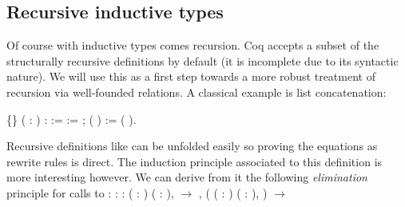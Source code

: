 \subsection{Recursive inductive types}




   Of course with inductive types comes recursion. Coq accepts a subset
   of the structurally recursive definitions by default (it is
   incomplete due to its syntactic nature). We will use this as a first
   step towards a more robust treatment of recursion via well-founded
   relations. A classical example is list concatenation: \begin{coqdoccode}
\coqdocemptyline
\coqdocnoindent
{}  \{\} (  :  ) :   :=\coqdoceol
\coqdocnoindent
{}   :=  ;\coqdoceol
\coqdocnoindent
{} (  )  :=   (  ).\coqdoceol
\coqdocemptyline
\end{coqdoccode}
Recursive definitions like  can be unfolded easily so proving the 
   equations as rewrite rules is direct. The induction principle associated 
   to this definition is more interesting however. We can derive from it the 
   following \textit{elimination} principle for calls to : \coqdoceol
\coqdocemptyline
\coqdocindent{1.50em}
 :\coqdoceol
\coqdocindent{1.50em}
\coqdockw{\ensuremath{\forall}}  : \coqdockw{\ensuremath{\forall}} ( : ) (  :  ),   \ensuremath{\rightarrow} ,\coqdoceol
\coqdocindent{1.50em}
(\coqdockw{\ensuremath{\forall}} ( : ) ( :  ),     ) \ensuremath{\rightarrow}\coqdoceol
